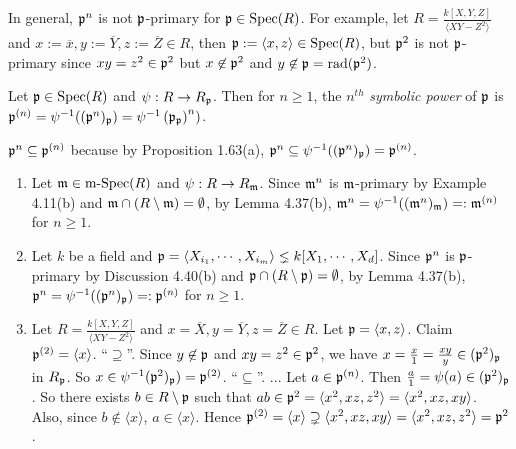 \begin{example}
    In general, $\mathfrak{p}^{n}$ is not $\mathfrak{p}$-primary for $\mathfrak{p} \in \operatorname{Spec}(R)$. For example, let $R = \frac{k[X,Y,Z]}{\langle XY-Z^{2} \rangle}$ and $x := \overline x,y := \overline Y, z := \overline Z \in R$, then $\mathfrak{p} := \langle x,z \rangle \in \operatorname{Spec}(R)$, but $\mathfrak{p}^{2}$ is not $\mathfrak{p}$-primary since $xy = z^{2} \in \mathfrak{p}^{2}$ but $x \not \in \mathfrak{p}^{2}$ and $y \not \in \mathfrak{p} = \operatorname{rad}(\mathfrak{p}^{2})$.
\end{example}

\begin{definition}
Let $\mathfrak{p} \in \operatorname{Spec}(R)$ and $\psi: R \to R_{\mathfrak{p}}$. Then for $n \geq 1$, the $n^{th}$ \emph{symbolic power} of $\mathfrak{p}$ is $\mathfrak{p}^{(n)} = \psi^{-1}((\mathfrak{p}^{n})_{\mathfrak{p}}) = \psi^{-1}\left( \mathfrak{p}_{\mathfrak{p}} \right)^{n})$. 
\end{definition}

\begin{note}
    $\mathfrak{p}^{n} \subseteq \mathfrak{p}^{(n)}$ because by Proposition 1.63(a), $\mathfrak{p}^{n} \subseteq \psi^{-1}((\mathfrak{p}^{n})_{\mathfrak{p}}) = \mathfrak{p}^{(n)}$.
\end{note}

\begin{example}
    \begin{enumerate}
        \item 
            Let $\mathfrak{m} \in \operatorname{m-Spec}(R)$ and $\psi: R \to R_{\mathfrak{m}}$. Since $\mathfrak{m}^{n}$ is $\mathfrak{m}$-primary by Example 4.11(b) and $\mathfrak{m} \cap (R \setminus \mathfrak{m}) = \emptyset$, by Lemma 4.37(b), $\mathfrak{m}^{n} = \psi^{-1}((\mathfrak{m}^{n})_{\mathfrak{m}}) =: \mathfrak{m}^{(n)}$ for $n \geq 1$. 
        \item Let $k$ be a field and $\mathfrak{p} = \langle X_{i_1}, \cdots, X_{i_m} \rangle \lneq k[X_1,\cdots,X_d]$. Since $\mathfrak{p}^{n}$ is $\mathfrak{p}$-primary by Discussion 4.40(b) and $\mathfrak{p} \cap (R \setminus \mathfrak{p}) = \emptyset$, by Lemma 4.37(b), $\mathfrak{p}^{n} = \psi^{-1}((\mathfrak{p}^{n})_{\mathfrak{p}}) =: \mathfrak{p}^{(n)}$ for $n \geq 1$.
        \item Let $R = \frac{k[X,Y,Z]}{\langle XY-Z^{2} \rangle}$ and $x = \overbar X, y = \overline Y, z = \overbar Z \in R$. Let $\mathfrak{p} = \langle x, z \rangle$. Claim $\mathfrak{p}^{(2)} = \langle x \rangle$. ``$\supseteq$''. Since $y \not \in \mathfrak{p}$ and $xy = z^{2} \in \mathfrak{p}^{2}$, we have $x = \frac{x}{1} = \frac{xy}{y} \in (\mathfrak{p}^{2})_{\mathfrak{p}}$ in $R_{\mathfrak{p}}$. So $x \in \psi^{-1}(\mathfrak{p}^{2})_{\mathfrak{p}}) = \mathfrak{p}^{(2)}$. ``$\subseteq$''. ... Let $a \in \mathfrak{p}^{(n)}$. Then $\frac{a}{1} = \psi(a) \in (\mathfrak{p}^{2})_{\mathfrak{p}}$. So there exists $b \in R \setminus \mathfrak{p}$ such that $ab \in \mathfrak{p}^{2} = \langle x^{2},xz,z^{2} \rangle = \langle x^{2}, xz,xy \rangle$. Also, since $b \not \in \langle x \rangle$, $a \in \langle x \rangle$. Hence $\mathfrak{p}^{(2)} = \langle x \rangle \supsetneq \langle x^{2},xz,xy \rangle = \langle x^{2},xz,z^{2} \rangle = \mathfrak{p}^{2}$.
    \end{enumerate}
\end{example}

